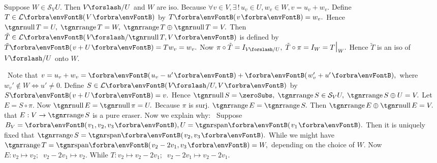 \BulletPointX\NoteFor{[3.88, 3.90, 3.91]} {\vspace{2pt}Suppose $W\in\mathcal{S}_V U.$ Then $V\XSlash U$ and $W$ are iso.}\TextB{}
{\vspace{2pt}Because $\forall v\in V,\exists\,!\,u_v\in U,w_v\in W,v=u_v+w_v.$ Define $T\in\Lm{V}$ by $T\Par{v}=w_v.$}\TextB{}
{\vspace{2pt}Hence $\null T=U,\;\range T=W,\;\range T\oplus\null T=V.$}\TextB{}
{\vspace{2pt}Then $\tilde{T}\in\Lm{V\XSlash \null T,V}$ is defined by $\tilde{T}\Par{v+U}=Tw_v=w_v.$}\TextB{}
{\vspace{2pt}Now $\pi\circ\tilde{T}=I_{V\XSlash U},\;\tilde{T}\circ\pi=I_{W}=T\mmid_W.$ Hence $\tilde{T}$ is an iso of $V\XSlash U$ onto $W.$}\par
{\vspace{2pt}\BulletPointX\Comment \,\,\,Note that $v=u_v+w_v=\Par{u_v-u'}+\Par{w_v'+u'},$ where $w_v'\not\in W\Longleftrightarrow u'\neq 0.$}\TextB{}
{\vspace{2pt}Define $S\in\Lm{V\XSlash U,V}$ by $S\Par{v+U}=v.$ Hence $\null S=\zeroSubs,\;\range S\in\mathcal{S}_V U,\;\range S\oplus U=V.$}\TextB{}
{\vspace{2pt}Let $E=S\circ\pi.$ Now $\null E=\null\pi=U.$ Because $\pi$ is surj. $\range E=\range S.$}\TextB{}
{\vspace{2pt}Then $\range E\oplus\null E=V.$ \NOTICE that $E:V\rightarrow\range S$ is a pure {\tgsl eraser}. Now we explain why:}\TextB{}
{\vspace{2pt}\Example \,\,\,Suppose $B_V=\Par{v_1,v_2,v_3},U=\Span{v_1}.$ Then it is uniquely fixed that $\range S=\Span{v_2,v_3}.$}\TextB{}
{\vspace{2pt}While we might have $\range T=\Span{v_2-2v_1,v_3}=W,$ depending on the choice of $W.$}\TextB{}
{Now $E:v_2\mapsto v_2;\;\;v_2-2v_1\mapsto v_2.$ While $T:v_2\mapsto v_2-2v_1;\;\;v_2-2v_1\mapsto v_2-2v_1.$}
\SepLine


